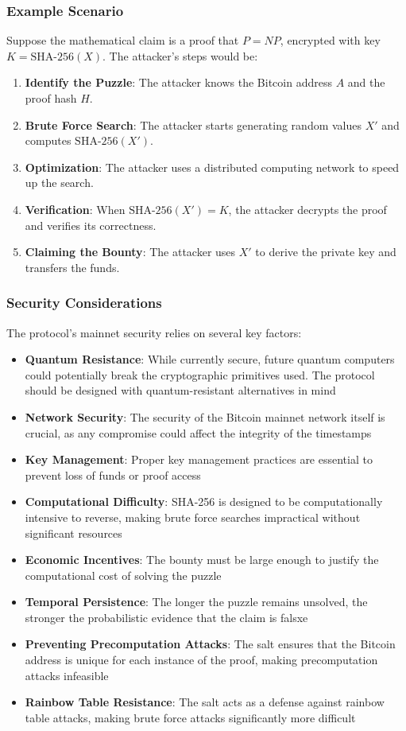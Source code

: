 \documentclass[12pt]{report}
\begin{document}
\subsubsection{Example Scenario}
Suppose the mathematical claim is a proof that \( P = NP \), encrypted with key \( K = \text{SHA-256}(X) \). The attacker's steps would be:

\begin{enumerate}
    \item \textbf{Identify the Puzzle}: The attacker knows the Bitcoin address \( A \) and the proof hash \( H \).
    \item \textbf{Brute Force Search}: The attacker starts generating random values \( X' \) and computes \( \text{SHA-256}(X') \).
    \item \textbf{Optimization}: The attacker uses a distributed computing network to speed up the search.
    \item \textbf{Verification}: When \( \text{SHA-256}(X') = K \), the attacker decrypts the proof and verifies its correctness.
    \item \textbf{Claiming the Bounty}: The attacker uses \( X' \) to derive the private key and transfers the funds.
\end{enumerate}

\subsubsection{Security Considerations}
The protocol's mainnet security relies on several key factors:
\begin{itemize}
    \item \textbf{Quantum Resistance}: While currently secure, future quantum computers could potentially break the cryptographic primitives used. The protocol should be designed with quantum-resistant alternatives in mind
    \item \textbf{Network Security}: The security of the Bitcoin mainnet network itself is crucial, as any compromise could affect the integrity of the timestamps
    \item \textbf{Key Management}: Proper key management practices are essential to prevent loss of funds or proof access
    \item \textbf{Computational Difficulty}: SHA-256 is designed to be computationally intensive to reverse, making brute force searches impractical without significant resources
    \item \textbf{Economic Incentives}: The bounty must be large enough to justify the computational cost of solving the puzzle
    \item \textbf{Temporal Persistence}: The longer the puzzle remains unsolved, the stronger the probabilistic evidence that the claim is falsxe
    \item \textbf{Preventing Precomputation Attacks}: The salt ensures that the Bitcoin address is unique for each instance of the proof, making precomputation attacks infeasible
    \item \textbf{Rainbow Table Resistance}: The salt acts as a defense against rainbow table attacks, making brute force attacks significantly more difficult
\end{itemize}
\end{document}
